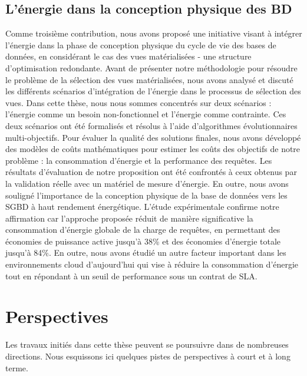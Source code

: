 \subsection{L'énergie dans la conception physique des BD}
Comme troisième contribution, nous avons proposé une initiative visant à intégrer l'énergie dans la phase de conception physique du cycle de vie des bases de données, en considérant le cas des vues matérialisées - une structure d'optimisation redondante.
Avant de présenter notre méthodologie pour résoudre le problème de la sélection des vues matérialisées, nous avons analysé et discuté les différents scénarios d'intégration de l'énergie dans le processus de sélection des vues. Dans cette thèse, nous nous sommes concentrés sur deux scénarios : l'énergie comme un besoin non-fonctionnel et l'énergie comme contrainte. Ces deux scénarios ont été formalisés et résolus à l'aide d'algorithmes évolutionnaires multi-objectifs. Pour évaluer la qualité des solutions finales, nous avons développé des modèles de coûts mathématiques pour estimer les coûts des objectifs de notre problème : la consommation d'énergie et la performance des requêtes. Les résultats d'évaluation de notre proposition ont été confrontés à ceux obtenus par la validation réelle avec un matériel de mesure d'énergie.
En outre, nous avons souligné l'importance de la conception physique de la base de données vers les SGBD à haut rendement énergétique. L'étude expérimentale confirme notre affirmation car l'approche proposée réduit de manière significative la consommation d'énergie globale de la charge de requêtes, en permettant des économies de puissance active jusqu'à 38\% et des économies d'énergie totale jusqu'à 84\%.
En outre, nous avons étudié un autre facteur important dans les environnements cloud d'aujourd'hui qui vise à réduire la consommation d'énergie tout en répondant à un seuil de performance sous un contrat de SLA.

\section{Perspectives}
Les travaux initiés dans cette thèse peuvent se poursuivre dans de nombreuses directions. Nous esquissons ici quelques pistes de perspectives à court et à long terme.

